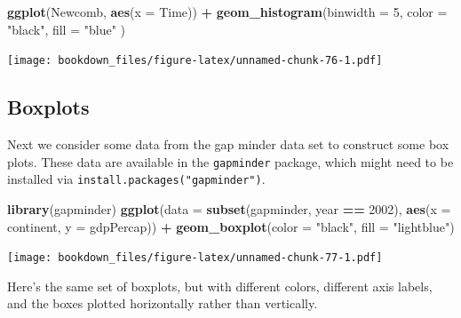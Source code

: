\documentclass[]{krantz}
\makeatletter
\newenvironment{Shaded}{\begin{snugshade}}{\end{snugshade}}
\newcommand{\KeywordTok}[1]{\textcolor[rgb]{0.27,0.27,0.27}{\textbf{#1}}}
\newcommand{\DataTypeTok}[1]{\textcolor[rgb]{0.27,0.27,0.27}{#1}}
\newcommand{\DecValTok}[1]{\textcolor[rgb]{0.06,0.06,0.06}{#1}}
\newcommand{\StringTok}[1]{\textcolor[rgb]{0.5,0.5,0.5}{#1}}
\newcommand{\OperatorTok}[1]{\textcolor[rgb]{0.43,0.43,0.43}{\textbf{#1}}}
\newcommand{\NormalTok}[1]{#1}
\newenvironment{kframe}{%
\medskip{}
\setlength{\fboxsep}{.8em}
 \def\at@end@of@kframe{}%
 \ifinner\ifhmode%
  \def\at@end@of@kframe{\end{minipage}}%
  \begin{minipage}{\columnwidth}%
 \fi\fi%
 \def\FrameCommand##1{\hskip\@totalleftmargin \hskip-\fboxsep
 \colorbox{shadecolor}{##1}\hskip-\fboxsep
     \hskip-\linewidth \hskip-\@totalleftmargin \hskip\columnwidth}%
 \MakeFramed {\advance\hsize-\width
   \@totalleftmargin\z@ \linewidth\hsize
   \@setminipage}}%
 {\par\unskip\endMakeFramed%
 \at@end@of@kframe}
\renewenvironment{Shaded}{\begin{kframe}}{\end{kframe}}
\makeatother
\begin{document}
\begin{Shaded}
\begin{Highlighting}[]
\KeywordTok{ggplot}\NormalTok{(Newcomb, }\KeywordTok{aes}\NormalTok{(}\DataTypeTok{x =}\NormalTok{ Time)) }\OperatorTok{+}\StringTok{ }
\StringTok{    }\KeywordTok{geom_histogram}\NormalTok{(}\DataTypeTok{binwidth =} \DecValTok{5}\NormalTok{, }\DataTypeTok{color =} \StringTok{"black"}\NormalTok{, }\DataTypeTok{fill =} \StringTok{"blue"}\NormalTok{ )}
\end{Highlighting}
\end{Shaded}

\texttt{[image: bookdown\_files/figure-latex/unnamed-chunk-76-1.pdf]}

\subsection{Boxplots}\label{boxplots}

Next we consider some data from the gap minder data set to construct
some box plots. These data are available in the \texttt{gapminder}
package, which might need to be installed via
\texttt{install.packages("gapminder")}.

\begin{Shaded}
\begin{Highlighting}[]
\KeywordTok{library}\NormalTok{(gapminder)}
\KeywordTok{ggplot}\NormalTok{(}\DataTypeTok{data =} \KeywordTok{subset}\NormalTok{(gapminder,  year }\OperatorTok{==}\StringTok{ }\DecValTok{2002}\NormalTok{), }
       \KeywordTok{aes}\NormalTok{(}\DataTypeTok{x =}\NormalTok{ continent, }\DataTypeTok{y =}\NormalTok{ gdpPercap)) }\OperatorTok{+}\StringTok{ }
\StringTok{    }\KeywordTok{geom_boxplot}\NormalTok{(}\DataTypeTok{color =} \StringTok{"black"}\NormalTok{, }\DataTypeTok{fill =} \StringTok{"lightblue"}\NormalTok{)}
\end{Highlighting}
\end{Shaded}

\texttt{[image: bookdown\_files/figure-latex/unnamed-chunk-77-1.pdf]}

Here's the same set of boxplots, but with different colors, different
axis labels, and the boxes plotted horizontally rather than vertically.
\end{document}
